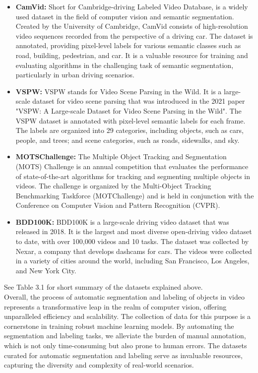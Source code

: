 \begin{itemize}
\item \textbf{CamVid:} Short for Cambridge-driving Labeled Video Database, is a widely used dataset in the field of computer vision and semantic segmentation. Created by the University of Cambridge, CamVid consists of high-resolution video sequences recorded from the perspective of a driving car. The dataset is annotated, providing pixel-level labels for various semantic classes such as road, building, pedestrian, and car. It is a valuable resource for training and evaluating algorithms in the challenging task of semantic segmentation, particularly in urban driving scenarios.

\clearpage

\item \textbf{VSPW:} VSPW stands for Video Scene Parsing in the Wild. It is a large-scale dataset for video scene parsing that was introduced in the 2021 paper "VSPW: A Large-scale Dataset for Video Scene Parsing in the Wild"\cite{VSPW_paper}. The VSPW dataset is annotated with pixel-level semantic labels for each frame. The labels are organized into 29 categories, including objects, such as cars, people, and trees; and scene categories, such as roads, sidewalks, and sky.


\item \textbf{MOTSChallenge:} The Multiple Object Tracking and Segmentation (MOTS) Challenge is an annual competition that evaluates the performance of state-of-the-art algorithms for tracking and segmenting multiple objects in videos. The challenge is organized by the Multi-Object Tracking Benchmarking Taskforce (MOTChallenge) and is held in conjunction with the Conference on Computer Vision and Pattern Recognition (CVPR). 

\item \textbf{BDD100K:} BDD100K is a large-scale driving video dataset that was released in 2018. It is the largest and most diverse open-driving video dataset to date, with over 100,000 videos and 10 tasks. The dataset was collected by Nexar, a company that develops dashcams for cars. The videos were collected in a variety of cities around the world, including San Francisco, Los Angeles, and New York City. 
\end{itemize}

\noindent
See Table 3.1 for short summary of the datasets explained above.\\

\noindent
Overall, the process of automatic segmentation and labeling of objects in video represents a transformative leap in the realm of computer vision, offering unparalleled efficiency and scalability. The collection of data for this purpose is a cornerstone in training robust machine learning models. By automating the segmentation and labeling tasks, we alleviate the burden of manual annotation, which is not only time-consuming but also prone to human errors. The datasets curated for automatic segmentation and labeling serve as invaluable resources, capturing the diversity and complexity of real-world scenarios.

